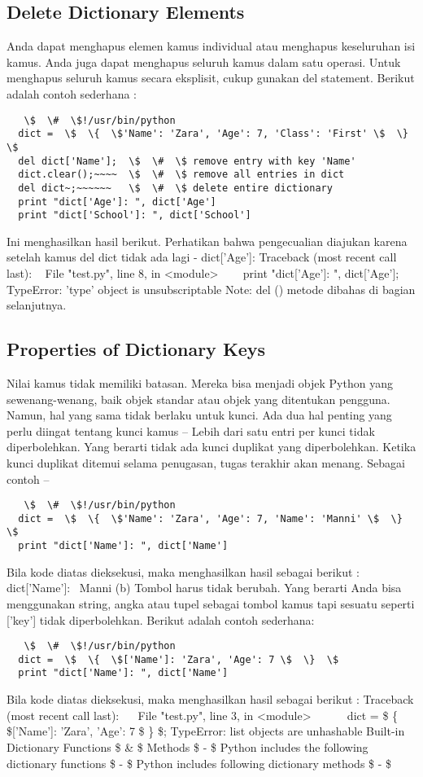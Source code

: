 \subsection{Delete Dictionary Elements}
Anda dapat menghapus elemen kamus individual atau menghapus keseluruhan isi kamus. Anda juga dapat menghapus seluruh kamus dalam satu operasi. 
Untuk menghapus seluruh kamus secara eksplisit, cukup gunakan del statement. Berikut adalah contoh sederhana : 
\begin{verbatim}   
   \$  \#  \$!/usr/bin/python
  dict =  \$  \{  \$'Name': 'Zara', 'Age': 7, 'Class': 'First' \$  \}  \$
  del dict['Name'];  \$  \#  \$ remove entry with key 'Name'
  dict.clear();~~~~  \$  \#  \$ remove all entries in dict 
  del dict~;~~~~~~   \$  \#  \$ delete entire dictionary 
  print "dict['Age']: ", dict['Age'] 
  print "dict['School']: ", dict['School']
\end{verbatim}  
Ini menghasilkan hasil berikut. Perhatikan bahwa pengecualian diajukan karena setelah kamus del dict tidak ada lagi - 
  dict['Age']: 
  Traceback (most recent call last): 
~   File "test.py", line 8, in <module> 
~~~     print "dict['Age']: ", dict['Age']; 
  TypeError: 'type' object is unsubscriptable 
Note: del () metode dibahas di bagian selanjutnya. 

\subsection{Properties of Dictionary Keys} 
Nilai kamus tidak memiliki batasan. Mereka bisa menjadi objek Python yang sewenang-wenang, baik objek standar atau objek yang ditentukan pengguna. Namun, hal yang sama tidak berlaku untuk kunci. 
Ada dua hal penting yang perlu diingat tentang kunci kamus – 
Lebih dari satu entri per kunci tidak diperbolehkan. Yang berarti tidak ada kunci duplikat yang diperbolehkan. Ketika kunci duplikat ditemui selama penugasan, tugas terakhir akan menang. Sebagai contoh – 
\begin{verbatim}   
   \$  \#  \$!/usr/bin/python 
  dict =  \$  \{  \$'Name': 'Zara', 'Age': 7, 'Name': 'Manni' \$  \}  \$ 
  print "dict['Name']: ", dict['Name']
\end{verbatim}  
Bila kode diatas dieksekusi, maka menghasilkan hasil sebagai berikut : 
  dict['Name']:~ Manni 
(b) Tombol harus tidak berubah. Yang berarti Anda bisa menggunakan string, angka atau tupel sebagai tombol kamus tapi sesuatu seperti ['key'] tidak diperbolehkan. Berikut adalah contoh sederhana: 
\begin{verbatim}   
   \$  \#  \$!/usr/bin/python 
  dict =  \$  \{  \$['Name']: 'Zara', 'Age': 7 \$  \}  \$ 
  print "dict['Name']: ", dict['Name']
\end{verbatim}
Bila kode diatas dieksekusi, maka menghasilkan hasil sebagai berikut : 
  Traceback (most recent call last): 
~~     File "test.py", line 3, in <module> 
~~~~~     dict =  \$  \{  \$['Name']: 'Zara', 'Age': 7 \$  \}  \$; 
  TypeError: list objects are unhashable 
Built-in Dictionary Functions  \$  \&  \$ Methods  \$ - \$ 
Python includes the following dictionary functions  \$ - \$ 
Python includes following dictionary methods  \$ - \$ 


